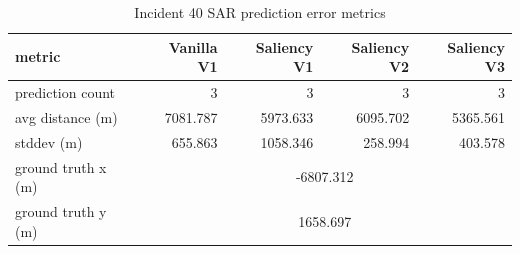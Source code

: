 \begin{table}[ht]
\centering
\caption{Incident 40 SAR prediction error metrics}
\label{tab:sar-incident-40}
\begin{tabular}{lrrrr}
\hline
metric & Vanilla V1 & Saliency V1 & Saliency V2 & Saliency V3 \\
\hline
prediction count & 3 & 3 & 3 & 3 \\
avg distance (m) & 7081.787 & 5973.633 & 6095.702 & 5365.561 \\
stddev (m) & 655.863 & 1058.346 & 258.994 & 403.578 \\
ground truth x (m) & \multicolumn{4}{c}{-6807.312} \\
ground truth y (m) & \multicolumn{4}{c}{1658.697} \\
\hline
\end{tabular}
\end{table}
